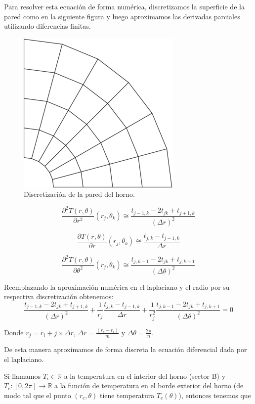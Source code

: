 Para resolver esta ecuación de forma numérica, discretizamos la superficie de la pared como en la siguiente figura y luego aproximamos las derivadas parciales utilizando diferencias finitas.

\begin{figure}[ht]
\begin{center}
\includegraphics[width=0.2\columnwidth]{catedra/disc.png}
\caption{Discretización de la pared del horno.}
\end{center}
\end{figure}

\begin{equation}
\frac{\partial^2T(r,\theta)}{\partial r^2}(r_j,\theta_k) \cong \frac{t_{j-1,k}-2t_{jk}+t_{j+1,k}}{(\Delta r)^2}
\end{equation}

\begin{equation}
\frac{\partial T(r,\theta)}{\partial r}(r_j,\theta_k) \cong \frac{t_{j,k}-t_{j-1,k}}{\Delta r}
\end{equation}

\begin{equation}
\frac{\partial^2T(r,\theta)}{\partial \theta^2}(r_j,\theta_k) \cong \frac{t_{j,k-1}-2t_{jk}+t_{j,k+1}}{(\Delta \theta)^2}
\end{equation}

Reemplazando la aproximación numérica en el laplaciano y el radio por su respectiva discretización obtenemos:
\begin{equation}\label{calor}
\frac{t_{j-1,k}-2t_{jk}+t_{j+1,k}}{(\Delta r)^2}
+ \frac{1}{r_j}
\frac{t_{j,k}-t_{j-1,k}}{\Delta r}
+
\frac{1}{r_j^2}
\frac{t_{j,k-1}-2t_{jk}+t_{j,k+1}}{(\Delta \theta)^2} = 0 \nonumber
\end{equation}

Donde $r_j = r_i + j \times \Delta r$, $\Delta r = \frac{(r_e - r_i)}{m}$ y $\Delta \theta = \frac{2\pi}{n}$.

De esta manera aproximamos de forma discreta la ecuación diferencial dada por el laplaciano.


Si llamamos $T_i \in \mathbb{R}$ a la temperatura en el interior del horno (sector B) y $T_e : [0,2\pi] \rightarrow \mathbb{R}$ a la función de temperatura en el borde exterior del horno (de modo tal que el punto $(r_e,\theta)$ tiene temperatura $T_e(\theta)$), entonces tenemos que

